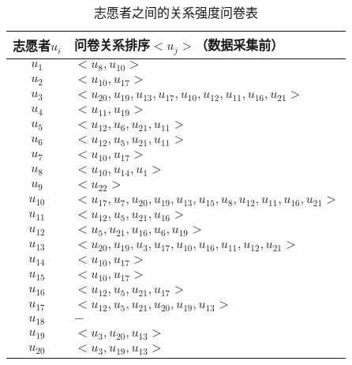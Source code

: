 \begin{table}[htb]
  \centering
  \begin{minipage}[t]{0.8\linewidth} %
  \caption[志愿者的关系强度问卷表]{志愿者之间的关系强度问卷表}
  \label{tab:truthresult}
    \begin{tabular*}{\linewidth}{cp{10cm}}
      \toprule[1.5pt]
      {志愿者\mbox{$u_{i}$}} & {问卷关系排序\mbox{$<u_{j}>$}（数据采集前）}  \\
      \midrule[1pt]
      \mbox{$u_{1}$} & \mbox{$<u_{8},u_{10}>$}  \\
      \mbox{$u_{2}$} & \mbox{$<u_{10},u_{17}>$}  \\
      \mbox{$u_{3} $}&\mbox{$ <u_{20},u_{19},u_{13},u_{17},u_{10},u_{12},u_{11},u_{16},u_{21}>$}\\
      \mbox{$u_{4}$} & \mbox{$<u_{11},u_{19}>$}\\
      \mbox{$u_{5} $}& \mbox{$<u_{12},u_{6},u_{21},u_{11}>$}\\
      \mbox{$u_{6}$} & \mbox{$<u_{12},u_{5},u_{21},u_{11}>$}\\
      \mbox{$u_{7}$} & \mbox{$<u_{10},u_{17}>$}\\
      \mbox{$u_{8}$} &\mbox{$ <u_{10},u_{14},u_{1}>$}\\
      \mbox{$u_{9} $}& \mbox{$<u_{22}>$}\\
      \mbox{$u_{10} $}& \mbox{$<u_{17},u_{7},u_{20},u_{19},u_{13},u_{15},u_{8},u_{12},u_{11},u_{16},u_{21}>$}\\
      \mbox{$u_{11} $}&  \mbox{$<u_{12},u_{5},u_{21},u_{16}>$}\\
      \mbox{$u_{12} $}& \mbox{$ <u_{5},u_{21},u_{16},u_{6},u_{19}>$}\\
      \mbox{$u_{13}$} &\mbox{$ <u_{20},u_{19},u_{3},u_{17},u_{10},u_{16},u_{11},u_{12},u_{21}>$}\\
      \mbox{$u_{14}$} &\mbox{$ <u_{10},u_{17} >$}\\
      \mbox{$u_{15}$} & \mbox{$<u_{10},u_{17}>$}\\
      \mbox{$u_{16}$} &\mbox{$ <u_{12},u_{5},u_{21},u_{17}>$}\\
      \mbox{$u_{17} $}& \mbox{$< u_{12},u_{5},u_{21},u_{20},u_{19},u_{13}   >$}\\
      \mbox{$u_{18} $}&\mbox{$ -$}\\
      \mbox{$u_{19} $}&\mbox{$ <u_{3},u_{20},u_{13}>$}\\
      \mbox{$u_{20}$} & \mbox{$<u_{3},u_{19},u_{13}>$}\\

\end{tabular*}
\end{minipage}
\end{table}
